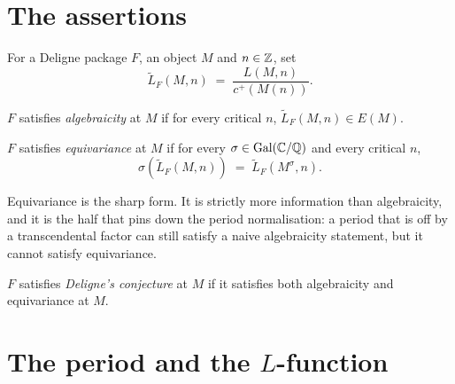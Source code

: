 \section{The assertions}
\label{sec:assertions}

\begin{definition}
  \label{def:normalizedValue}
  \leanok
  For a Deligne package $F$, an object $M$ and $n \in \mathbb{Z}$, set
  \[ \widetilde{L}_F(M,n) \;=\; \frac{L(M,n)}{c^{+}(M(n))}. \]
\end{definition}

\begin{definition}[Algebraicity]
  \label{def:algebraicity}
  \leanok
  $F$ satisfies \emph{algebraicity} at $M$ if for every critical $n$,
  $\widetilde{L}_F(M,n) \in E(M)$.
\end{definition}

\begin{definition}
  \label{def:equivariance}
  \leanok
  $F$ satisfies \emph{equivariance} at $M$ if for every $\sigma \in \operatorname{Gal}(\mathbb{C}/\mathbb{Q})$
  and every critical $n$,
  \[ \sigma\!\left(\widetilde{L}_F(M,n)\right) \;=\; \widetilde{L}_F(M^{\sigma},n). \]
\end{definition}

Equivariance is the sharp form. It is strictly more information than algebraicity,
and it is the half that pins down the period normalisation: a period that is off by a
transcendental factor can still satisfy a naive algebraicity statement, but it cannot
satisfy equivariance.

\begin{definition}
  \label{def:conjecture}
  \leanok
  $F$ satisfies \emph{Deligne's conjecture} at $M$ if it satisfies both algebraicity and
  equivariance at $M$.
\end{definition}

\section{The period and the \texorpdfstring{$L$}{L}-function}
\label{sec:no-L-field}

